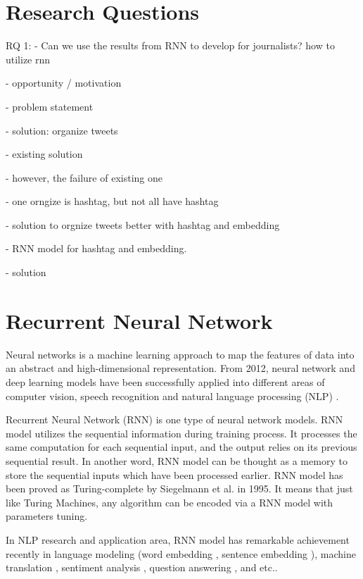 \section{Research Questions}

RQ 1:
- Can we use the results from RNN to develop for journalists? 
how to utilize rnn 


- opportunity / motivation

- problem statement

- solution: organize tweets

- existing solution

- however, the failure of existing one

- one orngize is hashtag, but not all have hashtag

- solution to orgnize tweets better with hashtag and embedding
 
- RNN model for hashtag and embedding. 

- solution 



\section{Recurrent Neural Network}
Neural networks is a machine learning approach to map the features of data into an abstract and high-dimensional representation. From 2012, neural network and deep learning models have been successfully applied into different areas of computer vision, speech recognition and natural language processing (NLP) \cite{LeCun2015}. 

Recurrent Neural Network (RNN) is one type of neural network models. RNN model utilizes the sequential information during training process. It processes the same computation for each sequential input, and the output relies on its previous sequential result. In another word, RNN model can be thought as a memory to store the sequential inputs which have been processed earlier.  RNN model has been proved as Turing-complete by Siegelmann et al.\cite{Siegelmann1995} in 1995. It means that just like Turing Machines, any algorithm can be encoded via a RNN model with parameters tuning. 

In NLP research and application area, RNN model has remarkable achievement recently in language modeling (word embedding \cite{Mikolov2013}, sentence embedding \cite{Kiros2015}), machine translation \cite{Sutskever2014}, sentiment analysis \cite{Socher2013}, question answering \cite{Iyyer2014}, and etc.. 

